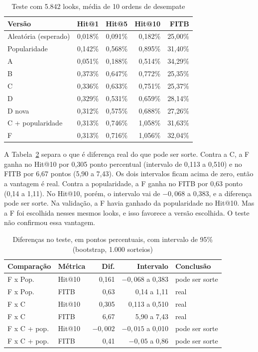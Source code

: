 \documentclass[conference]{IEEEtran}
\begin{document}
\begin{table}[t]
\caption{Teste com 5.842 looks, média de 10 ordens de desempate}
\label{tab:teste}
\centering
\footnotesize
\begin{tabular}{@{}lrrrr@{}}
\toprule
Versão & Hit@1 & Hit@5 & Hit@10 & FITB \\
\midrule
Aleatória (esperado) & 0,018\% & 0,091\% & 0,182\% & 25,00\% \\
Popularidade & 0,142\% & 0,568\% & 0,895\% & 31,40\% \\
A & 0,051\% & 0,188\% & 0,514\% & 34,29\% \\
B & 0,373\% & 0,647\% & 0,772\% & 25,35\% \\
C & 0,336\% & 0,633\% & 0,751\% & 25,37\% \\
D & 0,329\% & 0,531\% & 0,659\% & 28,14\% \\
D nova & 0,312\% & 0,575\% & 0,688\% & 27,26\% \\
C + popularidade & 0,313\% & 0,746\% & 1,058\% & 31,63\% \\
F & 0,313\% & 0,716\% & 1,056\% & 32,04\% \\
\bottomrule
\end{tabular}
\end{table}

A Tabela~\ref{tab:diferencas} separa o que é diferença real do que pode ser sorte. Contra a C, a F ganha no Hit@10 por 0,305 ponto percentual (intervalo de 0,113 a 0,510) e no FITB por 6,67 pontos (5,90 a 7,43). Os dois intervalos ficam acima de zero, então a vantagem é real. Contra a popularidade, a F ganha no FITB por 0,63 ponto (0,14 a 1,11). No Hit@10, porém, o intervalo vai de $-0{,}068$ a 0,383, e a diferença pode ser sorte. Na validação, a F havia ganhado da popularidade no Hit@10. Mas a F foi escolhida nesses mesmos looks, e isso favorece a versão escolhida. O teste não confirmou essa vantagem.

\begin{table}[t]
\caption{Diferenças no teste, em pontos percentuais, com intervalo de 95\% (bootstrap, 1.000 sorteios)}
\label{tab:diferencas}
\centering
\footnotesize
\begin{tabular}{@{}llrrl@{}}
\toprule
Comparação & Métrica & Dif. & Intervalo & Conclusão \\
\midrule
F x Pop. & Hit@10 & 0,161 & $-0{,}068$ a 0,383 & pode ser sorte \\
F x Pop. & FITB & 0,63 & 0,14 a 1,11 & real \\
F x C & Hit@10 & 0,305 & 0,113 a 0,510 & real \\
F x C & FITB & 6,67 & 5,90 a 7,43 & real \\
F x C + pop. & Hit@10 & $-0{,}002$ & $-0{,}015$ a 0,010 & pode ser sorte \\
F x C + pop. & FITB & 0,41 & $-0{,}05$ a 0,86 & pode ser sorte \\
\bottomrule
\end{tabular}
\end{table}
\end{document}
